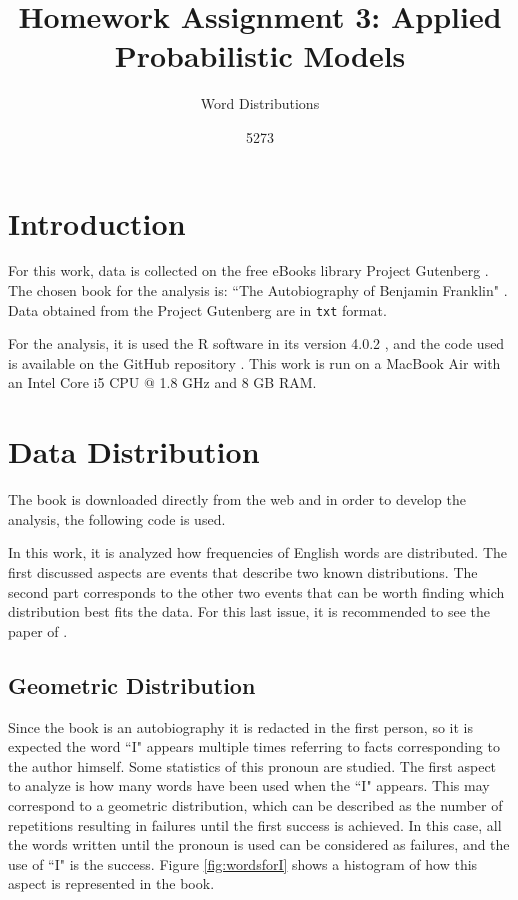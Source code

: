 \documentclass[10pt,leter,openany]{article}
\author{5273}
\title{Homework Assignment 3: Applied Probabilistic Models}
\subtitle{Word Distributions}
\date{}
\begin{document}
	
\maketitle

\section{Introduction}
	
	For this work, data is collected on the free eBooks library Project Gutenberg \citep{gutenberg}. The chosen book for the analysis is: ``The Autobiography of Benjamin Franklin" \citep{franklin2007autobiography}. Data obtained from the Project Gutenberg are in \texttt{txt} format.
	
	For the analysis, it is used the R software in its version 4.0.2 \citep{r}, and the code used is available on the GitHub repository \citep{github}. This work is run on a MacBook Air with an Intel Core i5 CPU $ @ $ 1.8 GHz and 8 GB RAM.
	
\section{Data Distribution}
	 
	The book is downloaded directly from the web and in order to develop the analysis, the following code is used.
	
	
	
	In this work, it is analyzed how frequencies of English words are distributed. The first discussed aspects are events that describe two known distributions. The second part corresponds to the other two events that can be worth finding which distribution best fits the data. For this last issue, it is recommended to see the paper of \citet{delignette2015fitdistrplus}.
	
\subsection{Geometric Distribution}
	Since the book is an autobiography it is redacted in the first person, so it is expected the word ``I" appears multiple times referring to facts corresponding to the author himself. Some statistics of this pronoun are studied. The first aspect to analyze is how many words have been used when the ``I" appears. This may correspond to a geometric distribution, which can be described as the number of repetitions resulting in failures until the first success is achieved. In this case, all the words written until the pronoun is used can be considered as failures, and the use of ``I" is the success. Figure \ref{fig:wordsforI} shows a histogram of how this aspect is represented in the book.
	
\end{document}
